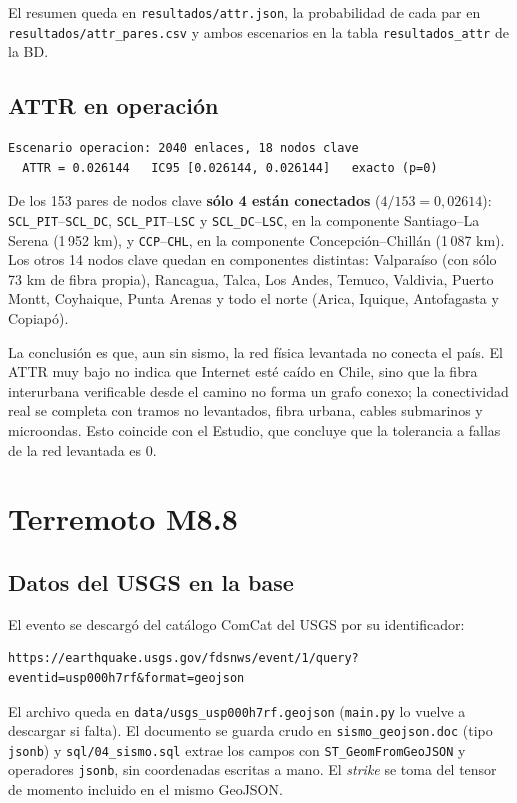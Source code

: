 \documentclass[11pt,a4paper]{article}
\newcommand{\cod}[1]{\texttt{#1}}
\begin{document}
El resumen queda en \cod{resultados/attr.json}, la probabilidad de cada par en
\cod{resultados/attr\_pares.csv} y ambos escenarios en la tabla \cod{resultados\_attr} de la BD.

\subsection{ATTR en operación}
\begin{Verbatim}
Escenario operacion: 2040 enlaces, 18 nodos clave
  ATTR = 0.026144   IC95 [0.026144, 0.026144]   exacto (p=0)
\end{Verbatim}

De los 153 pares de nodos clave \textbf{sólo 4 están conectados} ($4/153 = 0{,}02614$):
\cod{SCL\_PIT}--\cod{SCL\_DC}, \cod{SCL\_PIT}--\cod{LSC} y \cod{SCL\_DC}--\cod{LSC}, en la componente
Santiago--La Serena (1\,952 km), y \cod{CCP}--\cod{CHL}, en la componente Concepción--Chillán
(1\,087 km). Los otros 14 nodos clave quedan en componentes distintas: Valparaíso (con sólo 73 km de
fibra propia), Rancagua, Talca, Los Andes, Temuco, Valdivia, Puerto Montt, Coyhaique, Punta Arenas y
todo el norte (Arica, Iquique, Antofagasta y Copiapó).

La conclusión es que, aun sin sismo, la red física levantada no conecta el país. El ATTR muy bajo no
indica que Internet esté caído en Chile, sino que la fibra interurbana verificable desde el camino no
forma un grafo conexo; la conectividad real se completa con tramos no levantados, fibra urbana, cables
submarinos y microondas. Esto coincide con el Estudio, que concluye que la tolerancia a fallas de la
red levantada es 0.

\section{Terremoto M8.8}
\subsection{Datos del USGS en la base}
El evento se descargó del catálogo ComCat del USGS por su identificador:

\begin{Verbatim}
https://earthquake.usgs.gov/fdsnws/event/1/query?eventid=usp000h7rf&format=geojson
\end{Verbatim}

El archivo queda en \cod{data/usgs\_usp000h7rf.geojson} (\cod{main.py} lo vuelve a descargar si
falta). El documento se guarda crudo en \cod{sismo\_geojson.doc} (tipo \cod{jsonb}) y
\cod{sql/04\_sismo.sql} extrae los campos con \cod{ST\_GeomFromGeoJSON} y operadores \cod{jsonb}, sin
coordenadas escritas a mano. El \emph{strike} se toma del tensor de momento incluido en el mismo
GeoJSON.
\end{document}
